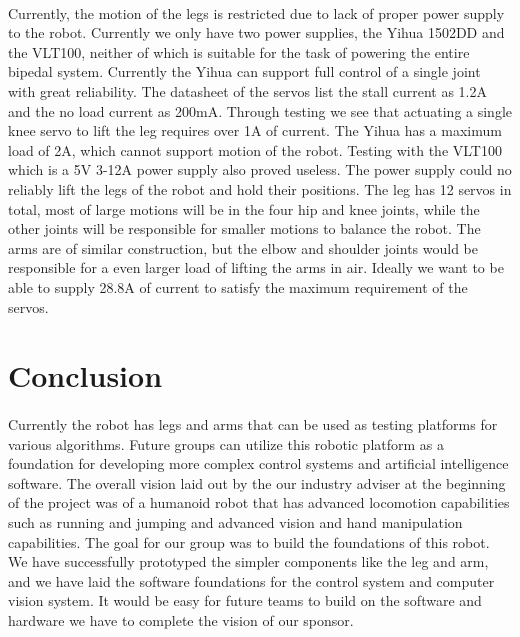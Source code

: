 \documentclass[titlepage,letterpaper,12pt]{article}
\begin{document}
\paragraph{}Currently, the motion of the legs is restricted due to lack of
proper power supply to the robot. Currently we only have two power supplies, the
Yihua 1502DD and the VLT100, neither of which is suitable for the task of
powering the entire bipedal system. Currently the Yihua can support full control
of a single joint with great reliability. The datasheet of the servos list the
stall current as 1.2A and the no load current as 200mA. Through testing we see
that actuating a single knee servo to lift the leg requires over 1A of current.
The Yihua has a maximum load of 2A, which cannot support motion of the robot.
Testing with the VLT100 which is a 5V 3-12A power supply also proved useless.
The power supply could no reliably lift the legs of the robot and hold their
positions. The leg has 12 servos in total, most of large motions will be in the
four hip and knee joints, while the other joints will be responsible for smaller
motions to balance the robot. The arms are of similar construction, but the
elbow and shoulder joints would be responsible for a even larger load of lifting
the arms in air. Ideally we want to be able to supply 28.8A of current to
satisfy the maximum requirement of the servos.

\section{Conclusion}
\paragraph{}Currently the robot has legs and arms that can be used as testing
platforms for various algorithms. Future groups can utilize this robotic
platform as a foundation for developing more complex control systems and
artificial intelligence software. The overall vision laid out by the our
industry adviser at the beginning of the project was of a humanoid robot that
has advanced locomotion capabilities such as running and jumping and advanced
vision and hand manipulation capabilities. The goal for our group was to build
the foundations of this robot. We have successfully prototyped the simpler
components like the leg and arm, and we have laid the software foundations for
the control system and computer vision system. It would be easy for future teams
to build on the software and hardware we have to complete the vision of our
sponsor.
\end{document}
